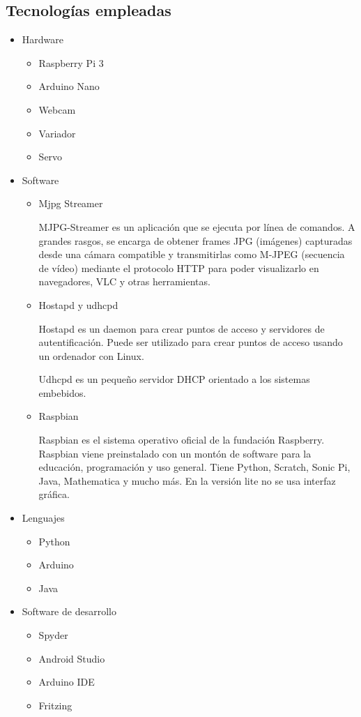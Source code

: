 \documentclass{pclass}
\begin{document}
\subsection{Tecnologías empleadas}

\begin{itemize}
	\item Hardware
		\begin{itemize}
			\item Raspberry Pi 3
			\item Arduino Nano
			\item Webcam
			\item Variador
			\item Servo
		\end{itemize}
	\item Software
	\begin{itemize}
		\item Mjpg Streamer
		
		MJPG-Streamer es un aplicación que se ejecuta por línea de comandos. A grandes rasgos, se encarga de obtener frames JPG (imágenes) capturadas desde una cámara compatible y transmitirlas como M-JPEG (secuencia de vídeo) mediante el protocolo HTTP para poder visualizarlo en navegadores, VLC y otras herramientas.
			\cite{mjpg}
		
		\item Hostapd y udhcpd
		
		Hostapd es un daemon para crear puntos de acceso y servidores de autentificación. Puede ser utilizado para crear puntos de acceso usando un ordenador con Linux. 
		
		Udhcpd es un pequeño servidor DHCP orientado a los sistemas embebidos.
		
			\cite{wireless}
		
		\item Raspbian	
		
		Raspbian es el sistema operativo oficial de la fundación Raspberry. Raspbian viene preinstalado con un montón de software para la educación, programación y uso general. Tiene Python, Scratch, Sonic Pi, Java, Mathematica y mucho más. En la versión lite no se usa interfaz gráfica.
		
			\cite{raspbian}
				
	\end{itemize}
	\item Lenguajes
		\begin{itemize}
			\item Python
			\item Arduino
			\item Java
		\end{itemize}
	\item Software de desarrollo
	\begin{itemize}
		\item Spyder
		\item Android Studio
		\item Arduino IDE
		\item Fritzing
		

\end{itemize}
\end{itemize}
\end{document}
